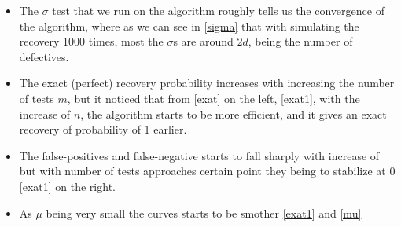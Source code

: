 \begin{itemize}
	\item The $ \sigma $ test that we run on the algorithm roughly tells us the convergence of the algorithm, where as we can see in  \ref{sigma} that with simulating the recovery 1000 times, most the $ \sigma $s are around $ 2d $, being the number of defectives. 
	
	\item The exact (perfect) recovery probability increases with increasing the number of tests $ m $,  but it noticed that from \ref{exat} on the left, \ref{exat1}, with the increase of $ n $, the algorithm starts to be more efficient, and it gives an exact recovery of probability of 1 earlier.    
	\item The false-positives and false-negative starts to fall sharply with increase of but with number of tests approaches certain point they being to stabilize at 0 \ref{exat1} on the right. 
	
	\item As $ \mu $ being very small the curves starts to be smother \ref{exat1} and \ref{mu}   
\end{itemize}
 